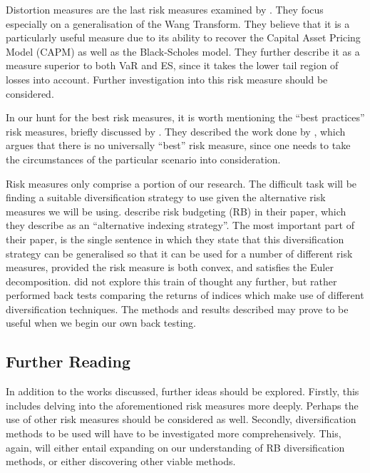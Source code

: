 \documentclass[12pt,a4paper]{article}
\begin{document}
Distortion measures are the last risk measures examined by \cite{dowd2006after}. They focus especially on a generalisation of the Wang Transform. They believe that it is a particularly useful measure due to its ability to recover the Capital Asset Pricing Model (CAPM) as well as the Black-Scholes model. They further describe it as a measure superior to both VaR and ES, since it takes the lower tail region of losses into account. Further investigation into this risk measure should be considered.

In our hunt for the best risk measures, it is worth mentioning the ``best practices'' risk measures, briefly discussed by \cite{dowd2006after}. They described the work done by \cite{dhaene2003economic}, which argues that there is no universally “best” risk measure, since one needs to take the circumstances of the particular scenario into consideration.

Risk measures only comprise a portion of our research. The difficult task will be finding a suitable diversification strategy to use given the alternative risk measures we will be using. \cite{bruder2012managing} describe risk budgeting (RB) in their paper, which they describe as an ``alternative indexing strategy''. The most important part of their paper, is the single sentence in which they state that this diversification strategy can be generalised so that it can be used for a number of different risk measures, provided the risk measure is both convex, and satisfies the Euler decomposition. \cite{bruder2012managing} did not explore this train of thought any further, but rather performed back tests comparing the returns of indices which make use of different diversification techniques. The methods and results described may prove to be useful when we begin our own back testing. 


\subsection{Further Reading}
\label{subsec:FurRead}

In addition to the works discussed, further ideas should be explored. Firstly, this includes delving into the aforementioned risk measures more deeply. Perhaps the use of other risk measures should be considered as well. Secondly, diversification methods to be used will have to be investigated more comprehensively. This, again, will either entail expanding on our understanding of RB diversification methods, or either discovering other viable methods. 
\end{document}
